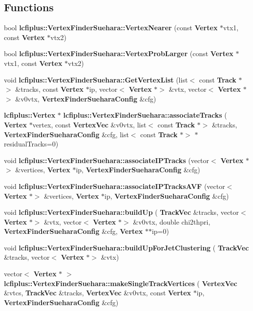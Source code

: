 \subsection*{Functions}
\begin{DoxyCompactItemize}
\item 
bool \textbf{ lcfiplus\+::\+Vertex\+Finder\+Suehara\+::\+Vertex\+Nearer} (const \textbf{ Vertex} $\ast$vtx1, const \textbf{ Vertex} $\ast$vtx2)
\item 
bool \textbf{ lcfiplus\+::\+Vertex\+Finder\+Suehara\+::\+Vertex\+Prob\+Larger} (const \textbf{ Vertex} $\ast$vtx1, const \textbf{ Vertex} $\ast$vtx2)
\item 
void \textbf{ lcfiplus\+::\+Vertex\+Finder\+Suehara\+::\+Get\+Vertex\+List} (list$<$ const \textbf{ Track} $\ast$$>$ \&tracks, const \textbf{ Vertex} $\ast$ip, vector$<$ \textbf{ Vertex} $\ast$$>$ \&vtx, vector$<$ \textbf{ Vertex} $\ast$$>$ \&v0vtx, \textbf{ Vertex\+Finder\+Suehara\+Config} \&cfg)
\item 
\textbf{ lcfiplus\+::\+Vertex} $\ast$ \textbf{ lcfiplus\+::\+Vertex\+Finder\+Suehara\+::associate\+Tracks} (\textbf{ Vertex} $\ast$vertex, const \textbf{ Vertex\+Vec} \&v0vtx, list$<$ const \textbf{ Track} $\ast$$>$ \&tracks, \textbf{ Vertex\+Finder\+Suehara\+Config} \&cfg, list$<$ const \textbf{ Track} $\ast$$>$ $\ast$residual\+Tracks=0)
\item 
void \textbf{ lcfiplus\+::\+Vertex\+Finder\+Suehara\+::associate\+I\+P\+Tracks} (vector$<$ \textbf{ Vertex} $\ast$$>$ \&vertices, \textbf{ Vertex} $\ast$ip, \textbf{ Vertex\+Finder\+Suehara\+Config} \&cfg)
\item 
void \textbf{ lcfiplus\+::\+Vertex\+Finder\+Suehara\+::associate\+I\+P\+Tracks\+A\+VF} (vector$<$ \textbf{ Vertex} $\ast$$>$ \&vertices, \textbf{ Vertex} $\ast$ip, \textbf{ Vertex\+Finder\+Suehara\+Config} \&cfg)
\item 
void \textbf{ lcfiplus\+::\+Vertex\+Finder\+Suehara\+::build\+Up} (\textbf{ Track\+Vec} \&tracks, vector$<$ \textbf{ Vertex} $\ast$$>$ \&vtx, vector$<$ \textbf{ Vertex} $\ast$$>$ \&v0vtx, double chi2thpri, \textbf{ Vertex\+Finder\+Suehara\+Config} \&cfg, \textbf{ Vertex} $\ast$$\ast$ip=0)
\item 
void \textbf{ lcfiplus\+::\+Vertex\+Finder\+Suehara\+::build\+Up\+For\+Jet\+Clustering} (\textbf{ Track\+Vec} \&tracks, vector$<$ \textbf{ Vertex} $\ast$$>$ \&vtx)
\item 
vector$<$ \textbf{ Vertex} $\ast$ $>$ \textbf{ lcfiplus\+::\+Vertex\+Finder\+Suehara\+::make\+Single\+Track\+Vertices} (\textbf{ Vertex\+Vec} \&vtcs, \textbf{ Track\+Vec} \&tracks, \textbf{ Vertex\+Vec} \&v0vtx, const \textbf{ Vertex} $\ast$ip, \textbf{ Vertex\+Finder\+Suehara\+Config} \&cfg)
$$
\end{DoxyCompactItemize}
